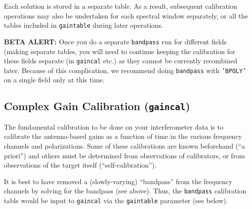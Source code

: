 Each solution is stored in a separate table.  As a result, subsequent
calibration operations may also be undertaken for each spectral window
separately, or all the tables included in {\tt gaintable} during
later operations.

{\bf BETA ALERT:} Once you do a separate {\tt bandpass} run for
different fields (making separate tables, you will need to continue
keeping the calibration for these fields separate (in {\tt gaincal}
etc.) as they cannot be currently recombined later.  Because
of this complication, we recommend doing {\tt bandpass} with
{\tt 'BPOLY'} on a single field only at this time.

\subsection{Complex Gain Calibration ({\tt gaincal})}
\label{section:cal.solve.gain}

The fundamental calibration to be done on your interferometer data
is to calibrate the antenna-based gains as a function of time in
the various frequency channels and polarizations.  Some of
these calibrations are known beforehand (``a priori'') and others
must be determined from observations of calibrators, or from observations
of the target itself (``self-calibration'').

It is best to have removed a (slowly-varying) ``bandpass'' from the
frequency channels by solving for the bandpass (see above).  Thus,
the {\tt bandpass} calibration table would be input to {\tt gaincal} via
the {\tt gaintable} parameter (see below).


